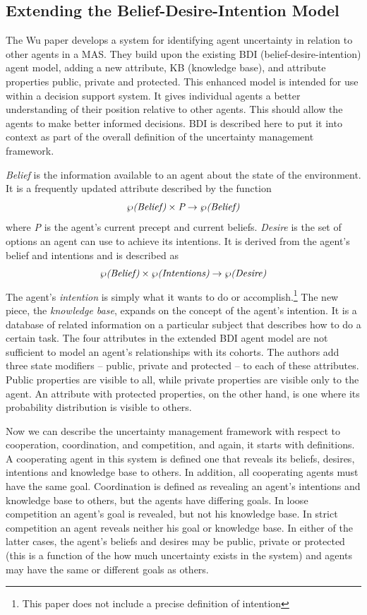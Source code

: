 \documentclass[11pt,letterpaper,onecolumn,twoside,openright,final]{report}
\begin{document}
\subsection{Extending the Belief-Desire-Intention Model}
The Wu paper\cite{wu2003umf} develops a system for identifying agent uncertainty in relation to other agents in a MAS.
They build upon the existing BDI (belief-desire-intention) agent model, adding
a new attribute, KB (knowledge base), and attribute properties public, private and protected.
This enhanced model is intended for use within a decision support system.
It gives individual agents a better understanding of their position relative to other agents.
This should allow the agents to make better informed decisions.
BDI is described here to put it into context as part of the overall definition of the uncertainty management framework.

\emph{Belief} is the information available to an agent about the state of the environment.
It is a frequently updated attribute described by the function \[\wp\emph{(Belief)}\times \emph{P}\to\wp\emph{(Belief)}\] where \emph{P} is the agent's current precept and current beliefs.
\emph{Desire} is the set of options an agent can use to achieve its intentions.
It is derived from the agent's belief and intentions and is described as \[\wp\emph{(Belief)}\times \wp\emph{(Intentions)}\to\wp\emph{(Desire)}\]
The agent's \emph{intention} is simply what it wants to do or accomplish.\footnote{This paper does not include a precise definition of intention}
The new piece, the \emph{knowledge base}, expands on the concept of the agent's intention.
It is a database of related information on a particular subject that describes how to do a certain task.
The four attributes in the extended BDI agent model are not sufficient to model an agent's relationships with its cohorts.
The authors add three state modifiers -- public, private and protected -- to each of these attributes.
Public properties are visible to all, while private properties are visible only to the agent.
An attribute with protected properties, on the other hand, is one where its probability distribution is visible to others.

Now we can describe the uncertainty management framework with respect to cooperation, coordination, and competition, and again, it starts with definitions.
A cooperating agent in this system is defined one that reveals its beliefs, desires, intentions and knowledge base to others.
In addition, all cooperating agents must have the same goal.
Coordination is defined as revealing an agent's intentions and knowledge base to others, but the agents have differing goals.
In loose competition an agent's goal is revealed, but not his knowledge base.
In strict competition an agent reveals neither his goal or knowledge base.
In either of the latter cases, the agent's beliefs and desires may be public, private or protected (this is a function of the how much uncertainty exists in the system) and agents may have the same or different goals as others.
\end{document}
